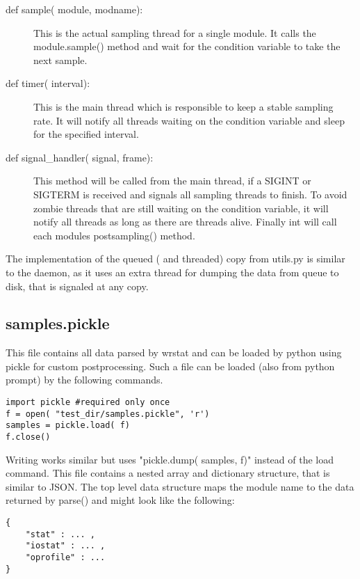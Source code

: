     \begin{description}
        \item[def sample( module, modname):]
            This is the actual sampling thread for a single module.
            It calls the module.sample() method and wait for the 
            condition variable to take the next sample.
        \item[def timer( interval):]
            This is the main thread which is responsible to keep a stable sampling rate.
            It will notify all threads waiting on the condition variable
            and sleep for the specified interval.
        \item[def signal\_handler( signal, frame):]
            This method will be called from the main thread,
            if a SIGINT or SIGTERM is received and signals all sampling threads to finish.
            To avoid zombie threads that are still waiting on the condition variable,
            it will notify all threads as long as there are threads alive.
            Finally int will call each modules postsampling() method.
    \end{description}

    The implementation of the queued ( and threaded) copy from utils.py is similar to the daemon,
    as it uses an extra thread for dumping the data from queue to disk, that is signaled at
    any copy.

\subsection{samples.pickle}
    This file contains all data parsed by wrstat and can be loaded by python using pickle
    for custom postprocessing.
    Such a file can be loaded (also from python prompt) by the following commands.

\begin{lstlisting}
import pickle #required only once
f = open( "test_dir/samples.pickle", 'r')                            
samples = pickle.load( f)
f.close()
\end{lstlisting}

    Writing works similar but uses "pickle.dump( samples, f)" instead of the load command.
    This file contains a nested array and dictionary structure, that is similar to JSON.
    The top level data structure maps the module name to the data returned by parse()
    and might look like the following:

\begin{lstlisting}
{
    "stat" : ... ,
    "iostat" : ... ,
    "oprofile" : ...
}
\end{lstlisting}
